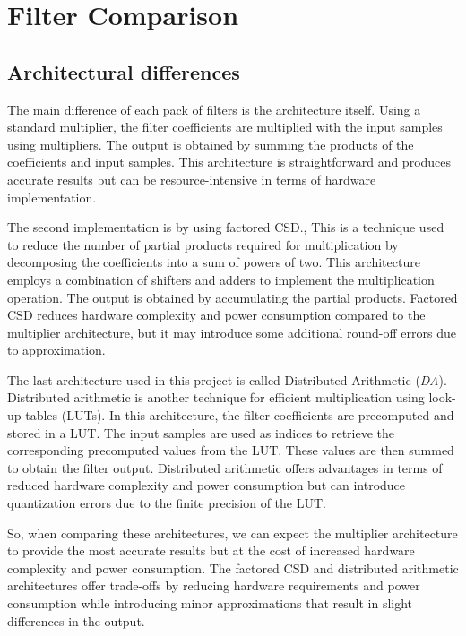 
\section{Filter Comparison}

\subsection{Architectural differences}
The main difference of each pack of filters is the architecture itself.
Using a standard multiplier, the filter coefficients are multiplied with the input samples using multipliers. The output is obtained by summing the products of the coefficients and input samples. This architecture is straightforward and produces accurate results but can be resource-intensive in terms of hardware implementation.

The second implementation is by using factored CSD., This is a technique used to reduce the number of partial products required for multiplication by decomposing the coefficients into a sum of powers of two. This architecture employs a combination of shifters and adders to implement the multiplication operation. The output is obtained by accumulating the partial products. Factored CSD reduces hardware complexity and power consumption compared to the multiplier architecture, but it may introduce some additional round-off errors due to approximation.

The last architecture used in this project is called Distributed Arithmetic (\emph{DA}).
Distributed arithmetic is another technique for efficient multiplication using look-up tables (LUTs). In this architecture, the filter coefficients are precomputed and stored in a LUT. The input samples are used as indices to retrieve the corresponding precomputed values from the LUT. These values are then summed to obtain the filter output. Distributed arithmetic offers advantages in terms of reduced hardware complexity and power consumption but can introduce quantization errors due to the finite precision of the LUT.

So, when comparing these architectures, we can expect the multiplier architecture to provide the most accurate results but at the cost of increased hardware complexity and power consumption.
The factored CSD and distributed arithmetic architectures offer trade-offs by reducing hardware requirements and power consumption while introducing minor approximations that result in slight differences in the output.

